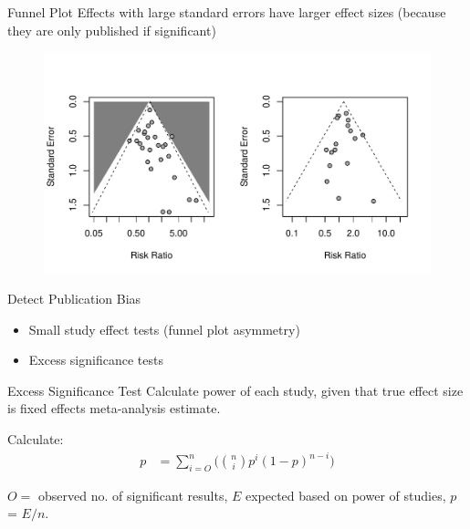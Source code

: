 \documentclass[english]{beamer}\usepackage[]{graphicx}\usepackage[]{color}
\makeatletter
\def\maxwidth{ %
  \ifdim\Gin@nat@width>\linewidth
    \linewidth
  \else
    \Gin@nat@width
  \fi
}
\newenvironment{knitrout}{}{} %
\makeatother
\begin{document}
\begin{frame}[fragile]{Funnel Plot}
Effects with large standard errors have larger effect sizes (because they are only published
if significant)

\vspace{-10mm}
\begin{figure}
\begin{knitrout}
\color{fgcolor}
\includegraphics[width=\maxwidth]{figure/unnamed-chunk-3-1} 

\end{knitrout}
\end{figure}
\end{frame}

\begin{frame}{Detect Publication Bias}
\begin{itemize}
\item Small study effect tests (funnel plot asymmetry)
\item Excess significance tests
\end{itemize}
\end{frame}

\begin{frame}{Excess Significance Test}
Calculate power of each study, given that true effect size is
fixed effects meta-analysis estimate.

Calculate:
\begin{align}
p &= \sum_{i = O}^n\Big({n \choose i} p^i (1-p)^{n - i}\Big) \nonumber
\end{align}

\vspace{-1mm}
$O = $ observed no. of significant results, $E$ expected based on power of studies, $p$ = $E/n$.
\end{frame}
\end{document}

